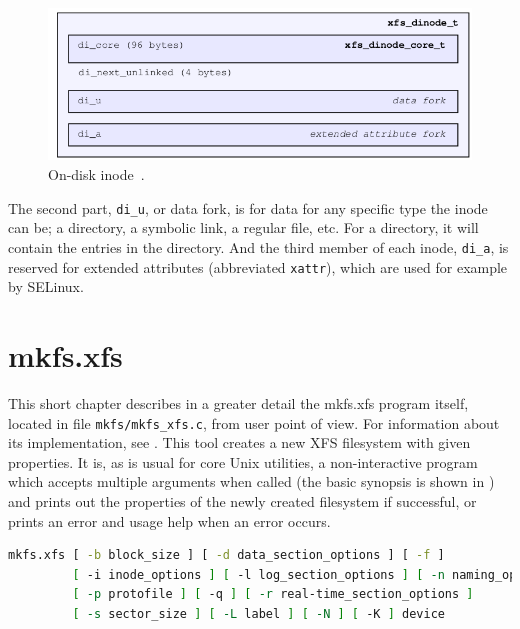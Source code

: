 \begin{figure}
  \centering
 \includegraphics[width=12cm,keepaspectratio]{fig/inode} %
 \caption{On-disk inode~\cite[Ch. 4]{xfsStructure}.}
\label{fig:xfs:inode}
\end{figure}

The second part, {\tt di\_u}, or data fork, is for data for any specific type the inode can be; a directory, a symbolic link, a regular file, etc. For a directory, it will contain the entries in the directory. And the third member of each inode, {\tt di\_a}, is reserved for extended attributes (abbreviated {\tt xattr}), which are used for example by SELinux.

\section{mkfs.xfs}\label{chap:xfs:mkfs}

This short chapter describes in a greater detail the mkfs.xfs program
itself, located in file {\tt mkfs/mkfs\_xfs.c}, from user point of view.
For information about its implementation, see
. This tool creates a new XFS
filesystem with given properties. It is, as is usual for core Unix
utilities, a non-interactive program which accepts multiple arguments when
called (the basic synopsis is shown in ) and prints
out the properties of the newly created filesystem if successful, or prints
an error and usage help when an error occurs.

\begin{lstlisting}[frame=none, basicstyle=\footnotesize\ttfamily,
language=Bash, numbers=none,
numberstyle=\tiny\color{black},
caption={Synopsis of mkfs.xfs utility~\cite{mkfs.xfsMan}.},
label={lst:xfs:synopsis}]
mkfs.xfs [ -b block_size ] [ -d data_section_options ] [ -f ]
         [ -i inode_options ] [ -l log_section_options ] [ -n naming_options ]
         [ -p protofile ] [ -q ] [ -r real-time_section_options ]
         [ -s sector_size ] [ -L label ] [ -N ] [ -K ] device
\end{lstlisting}

